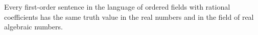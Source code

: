Every first-order sentence in the language of ordered fields with rational coefficients has the same truth value in the real numbers and in the field of real algebraic numbers.
